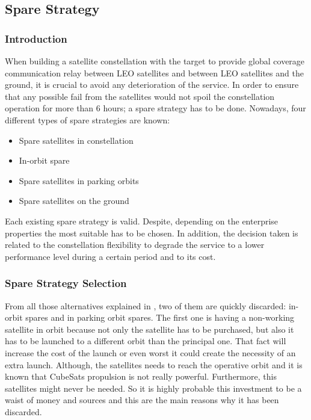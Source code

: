 \subsection{Spare Strategy}

\subsubsection{Introduction}
When building a satellite constellation with the target to provide global coverage communication relay between LEO satellites and between LEO satellites and the ground, it is crucial to avoid any deterioration of the service. In order to ensure that any possible fail from the satellites would not spoil the constellation operation for more than 6 hours; a spare strategy has to be done. Nowadays, four different types of spare strategies are known:

\begin{itemize} 
\item {Spare satellites in constellation}
\item {In-orbit spare} 
\item {Spare satellites in parking orbits} 
\item {Spare satellites on the ground} 
\end{itemize}

Each existing spare strategy is valid. Despite, depending on the enterprise properties the most suitable has to be chosen. In addition, the decision taken is related to the constellation flexibility to degrade the service to a lower performance level during a certain period and to its cost. 

\subsubsection{Spare Strategy Selection}
From all those alternatives explained in \cite[Chapter 1, Section 4]{annex2}, two of them  are quickly discarded: in-orbit spares and in parking orbit spares. The first one is having a non-working satellite in orbit because not only the satellite has to be purchased, but also it has to be launched to a different orbit than the principal one. That fact will increase the cost of the launch or even worst it could create the necessity of an extra launch. Although, the satellites needs to reach the operative orbit and it is known that CubeSats propulsion is not really powerful. Furthermore, this satellites might never be needed. So it is highly probable this investment to be a waist of money and sources and this are the main reasons why it has been discarded.

